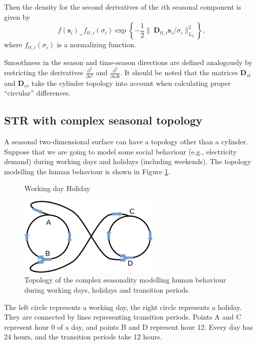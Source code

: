 \documentclass[ijds,nonblindrev]{informs-ijds}
\begin{document}
Then the density for the second derivatives of the \(i\)th seasonal component is given by
\[
  f(\bm{s}_i)_ =f_{tt,i}(\sigma_i) \exp\left\{-\frac{1}{2}\big\|\ \bm{D}_{tt,i}\bm{s}_i / \sigma_i\big\|_{L_2}^2\right\},
\]
where \(f_{tt,i}(\sigma_i)\) is a normalizing function.

Smoothness in the season and time-season directions are defined analogously by restricting the derivatives \(\frac{\partial^2}{\partial s^2}\) and \(\frac{\partial^2}{\partial s \partial t}\). It should be noted that the matrices \(\bm{D}_{st}\) and \(\bm{D}_{ss}\) take the cylinder topology into account when calculating proper ``circular'' differences.

\hypertarget{sec:complex-topology}{%
\subsection{STR with complex seasonal topology}\label{sec:complex-topology}}

A seasonal two-dimensional surface can have a topology other than a cylinder. Suppose that we are going to model some social behaviour (e.g., electricity demand) during working days and holidays (including weekends). The topology modelling the human behaviour is shown in Figure \ref{fig:topology_pdf}.

\begin{figure}
  \centering
  \centerline{Working day \hspace*{4.5cm} Holiday}
  \includegraphics[width=0.6\textwidth]{topology.pdf}
  \caption{Topology of the complex seasonality modelling human behaviour during working days, holidays and transition periods.}
  \label{fig:topology_pdf}
\end{figure}

The left circle represents a working day, the right circle represents a holiday. They are connected by lines representing transition periods. Points A and C represent hour 0 of a day, and points B and D represent hour 12. Every day has 24 hours, and the transition periods take 12 hours.
\end{document}
